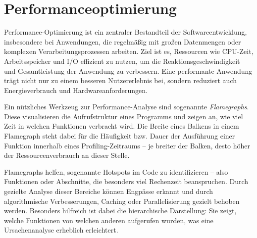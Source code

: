 \section{Performanceoptimierung}\label{sec:Performanceoptimierung}

Performance-Optimierung ist ein zentraler Bestandteil der Softwareentwicklung, insbesondere bei Anwendungen, die regelmäßig mit
großen Datenmengen oder komplexen Verarbeitungsprozessen arbeiten. Ziel ist es, Ressourcen wie CPU-Zeit, Arbeitsspeicher und I/O
effizient zu nutzen, um die Reaktionsgeschwindigkeit und Gesamtleistung der Anwendung zu verbessern. Eine performante Anwendung
trägt nicht nur zu einem besseren Nutzererlebnis bei, sondern reduziert auch Energieverbrauch und Hardwareanforderungen.

Ein nützliches Werkzeug zur Performance-Analyse sind sogenannte \textit{Flamegraphs}. Diese visualisieren die Aufrufstruktur eines
Programms und zeigen an, wie viel Zeit in welchen Funktionen verbracht wird. Die Breite eines Balkens in einem Flamegraph steht
dabei für die Häufigkeit bzw. Dauer der Ausführung einer Funktion innerhalb eines Profiling-Zeitraums – je breiter der Balken,
desto höher der Ressourcenverbrauch an dieser Stelle.

Flamegraphs helfen, sogenannte Hotspots im Code zu identifizieren – also Funktionen oder Abschnitte, die besonders viel
Rechenzeit beanspruchen. Durch gezielte Analyse dieser Bereiche können Engpässe erkannt und durch algorithmische Verbesserungen,
Caching oder Parallelisierung gezielt behoben werden. Besonders hilfreich ist dabei die hierarchische Darstellung: Sie zeigt,
welche Funktionen von welchen anderen aufgerufen wurden, was eine Ursachenanalyse erheblich erleichtert.
